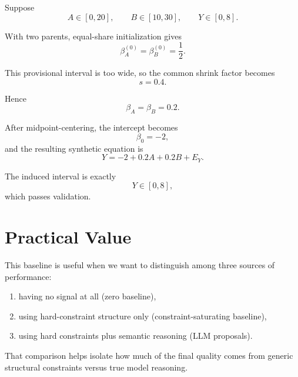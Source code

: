 \documentclass[11pt]{article}
\begin{document}
Suppose
\[
A \in [0,20], \qquad B \in [10,30], \qquad Y \in [0,8].
\]

With two parents, equal-share initialization gives
\[
\beta_A^{(0)} = \beta_B^{(0)} = \frac{1}{2}.
\]

This provisional interval is too wide, so the common shrink factor becomes
\[
s = 0.4.
\]

Hence
\[
\beta_A = \beta_B = 0.2.
\]

After midpoint-centering, the intercept becomes
\[
\beta_0 = -2,
\]
and the resulting synthetic equation is
\[
Y = -2 + 0.2A + 0.2B + E_Y.
\]

The induced interval is exactly
\[
Y \in [0,8],
\]
which passes validation.

\section{Practical Value}

This baseline is useful when we want to distinguish among three sources of performance:
\begin{enumerate}
    \item having no signal at all (zero baseline),
    \item using hard-constraint structure only (constraint-saturating baseline),
    \item using hard constraints plus semantic reasoning (LLM proposals).
\end{enumerate}

That comparison helps isolate how much of the final quality comes from generic structural constraints versus true model reasoning.
\end{document}
